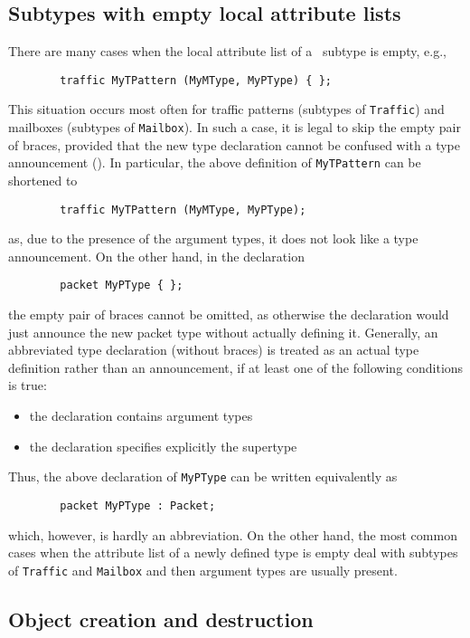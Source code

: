\subsection {Subtypes with empty local attribute lists}
\label{rm_st_ea}

There are many cases when the local attribute list of a \smurph\ subtype
is empty, e.g.,
\begin{verbatim}
        traffic MyTPattern (MyMType, MyPType) { };
\end{verbatim}
This situation occurs most often for traffic patterns (subtypes of
{\tt Traffic}) and mailboxes (subtypes of {\tt Mailbox}).
In such a case, it is legal to skip the empty pair of braces, provided that
the new type declaration cannot be confused with a type
announcement ().
In particular, the above definition of {\tt MyTPattern} can be shortened to
\begin{verbatim}
        traffic MyTPattern (MyMType, MyPType);
\end{verbatim}
as, due to the presence of the argument types, it does not look like a type
announcement.
On the other hand, in the declaration
\begin{verbatim}
        packet MyPType { };
\end{verbatim}
the empty pair of braces cannot be omitted, as otherwise the declaration would
just announce the new packet type without actually defining it.
Generally, an abbreviated type declaration (without braces) is treated as
an actual type definition rather than an announcement, if at least one of
the following conditions is true:
\begin{itemize}
\item
the declaration contains argument types
\item
the declaration specifies explicitly the supertype
\end{itemize}
Thus, the above declaration of {\tt MyPType} can be written equivalently as
\begin{verbatim}
        packet MyPType : Packet;
\end{verbatim}
which, however, is hardly an abbreviation.
On the other hand, the most common cases when the attribute list of a newly
defined type is empty deal with subtypes of {\tt Traffic} and {\tt Mailbox}
and then argument types are usually present.

\subsection{Object creation and destruction}
\label{rm_st_oc}

